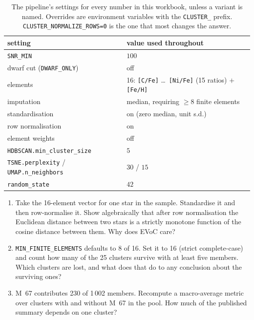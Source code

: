 \begin{table}[htbp]
\centering
\small
{}
\begin{tabular}{@{}ll@{}}
\toprule
setting & value used throughout \\
\midrule
\texttt{SNR\_MIN} & $100$ \\
dwarf cut (\texttt{DWARF\_ONLY}) & off \\
elements & 16: \texttt{[C/Fe]} \dots\ \texttt{[Ni/Fe]} (15 ratios) $+$ \texttt{[Fe/H]} \\
imputation & median, requiring $\geq\!8$ finite elements \\
standardisation & on (zero median, unit s.d.) \\
row normalisation & on \\
element weights & off \\
\texttt{HDBSCAN.min\_cluster\_size} & $5$ \\
\texttt{TSNE.perplexity} / \texttt{UMAP.n\_neighbors} & $30$ / $15$ \\
\texttt{random\_state} & $42$ \\
\bottomrule
\end{tabular}
\caption{The pipeline's settings for every number in this workbook, unless a
variant is named. Overrides are environment variables with the
\texttt{CLUSTER\_} prefix. \texttt{CLUSTER\_NORMALIZE\_ROWS=0} is the one that
most changes the answer.}
\label{tab:config}
\end{table}

\begin{issues}[EXERCISES]
\begin{enumerate}
\item Take the 16-element vector for one star in the sample. Standardise it
  and then row-normalise it. Show algebraically that after row normalisation
  the Euclidean distance between two stars is a strictly monotone function of
  the cosine distance between them. Why does EVoC care?
\item \texttt{MIN\_FINITE\_ELEMENTS} defaults to 8 of 16. Set it to 16 (strict
  complete-case) and count how many of the 25 clusters survive with at least
  five members. Which clusters are lost, and what does that do to any
  conclusion about the surviving ones?
\item M~67 contributes 230 of 1\,002 members. Recompute a macro-average
  metric over clusters with and without M~67 in the pool. How much of the
  published summary depends on one cluster?
\end{enumerate}
\end{issues}
